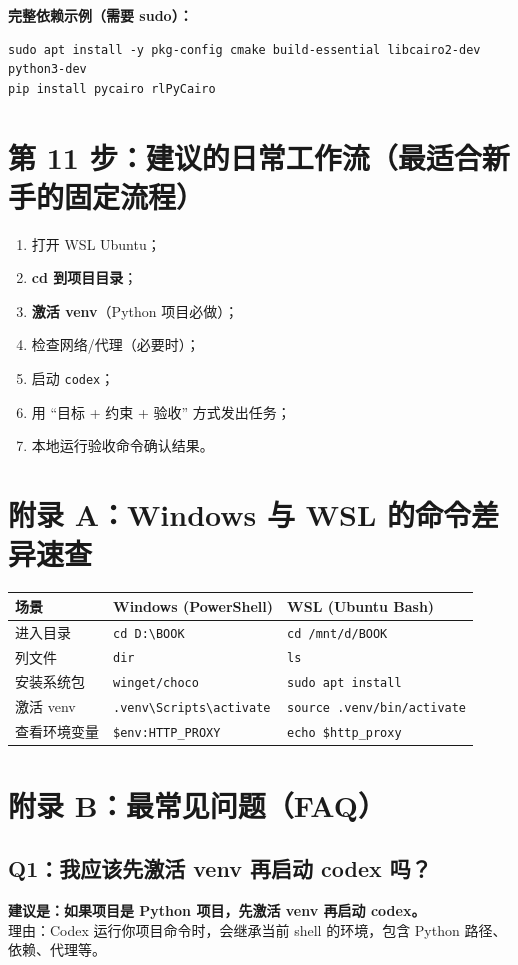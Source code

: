 \documentclass[11pt,a4paper]{article}
\begin{document}
\textbf{完整依赖示例（需要 sudo）：}
\begin{lstlisting}
sudo apt install -y pkg-config cmake build-essential libcairo2-dev python3-dev
pip install pycairo rlPyCairo
\end{lstlisting}

\section{第 11 步：建议的日常工作流（最适合新手的固定流程）}
\begin{enumerate}[leftmargin=1.7em]
  \item 打开 WSL Ubuntu；
  \item \textbf{cd 到项目目录}；
  \item \textbf{激活 venv}（Python 项目必做）；
  \item 检查网络/代理（必要时）；
  \item 启动 \texttt{codex}；
  \item 用 ``目标 + 约束 + 验收'' 方式发出任务；
  \item 本地运行验收命令确认结果。
\end{enumerate}

\section{附录 A：Windows 与 WSL 的命令差异速查}
\begin{longtable}{@{}p{}p{}p{}@{}}
\toprule
场景 & Windows (PowerShell) & WSL (Ubuntu Bash) \\
\midrule
进入目录 & \texttt{cd D:\textbackslash BOOK} & \texttt{cd /mnt/d/BOOK} \\
列文件 & \texttt{dir} & \texttt{ls} \\
安装系统包 & \texttt{winget/choco} & \texttt{sudo apt install} \\
激活 venv & \texttt{.venv\textbackslash Scripts\textbackslash activate} & \texttt{source .venv/bin/activate} \\
查看环境变量 & \texttt{\$env:HTTP\_PROXY} & \texttt{echo \$http\_proxy} \\
\bottomrule
\end{longtable}

\section{附录 B：最常见问题（FAQ）}
\subsection*{Q1：我应该先激活 venv 再启动 codex 吗？}
\textbf{建议是：如果项目是 Python 项目，先激活 venv 再启动 codex。}\\
理由：Codex 运行你项目命令时，会继承当前 shell 的环境，包含 Python 路径、依赖、代理等。
\end{document}

